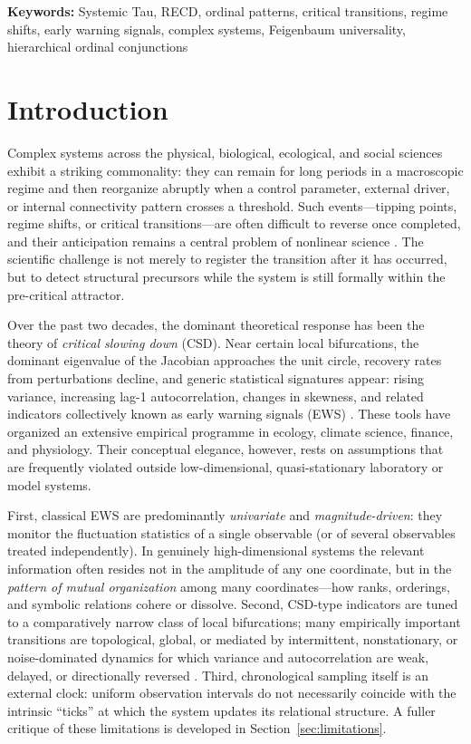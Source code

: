 \documentclass[11pt,a4paper]{article}
\begin{document}
\noindent\textbf{Keywords:}
Systemic Tau, RECD, ordinal patterns, critical transitions, regime shifts,
early warning signals, complex systems, Feigenbaum universality,
hierarchical ordinal conjunctions

\vspace{0.5cm}

\section{Introduction}
\label{sec:introduction}


Complex systems across the physical, biological, ecological, and social
sciences exhibit a striking commonality: they can remain for long periods
in a macroscopic regime and then reorganize abruptly when a control
parameter, external driver, or internal connectivity pattern crosses a
threshold. Such events---tipping points, regime shifts, or critical
transitions---are often difficult to reverse once completed, and their
anticipation remains a central problem of nonlinear science
\cite{Scheffer2009,Scheffer2012,Dakos2012}. The scientific challenge is
not merely to register the transition after it has occurred, but to detect
structural precursors while the system is still formally within the
pre-critical attractor.

Over the past two decades, the dominant theoretical response has been the
theory of \emph{critical slowing down} (CSD). Near certain local
bifurcations, the dominant eigenvalue of the Jacobian approaches the unit
circle, recovery rates from perturbations decline, and generic statistical
signatures appear: rising variance, increasing lag-1 autocorrelation,
changes in skewness, and related indicators collectively known as early
warning signals (EWS) \cite{Scheffer2009,Dakos2012,Boettiger2013}. These
tools have organized an extensive empirical programme in ecology,
climate science, finance, and physiology. Their conceptual elegance,
however, rests on assumptions that are frequently violated outside
low-dimensional, quasi-stationary laboratory or model systems.

First, classical EWS are predominantly \emph{univariate} and
\emph{magnitude-driven}: they monitor the fluctuation statistics of a
single observable (or of several observables treated independently). In
genuinely high-dimensional systems the relevant information often resides
not in the amplitude of any one coordinate, but in the
\emph{pattern of mutual organization} among many coordinates---how ranks,
orderings, and symbolic relations cohere or dissolve. Second, CSD-type
indicators are tuned to a comparatively narrow class of local
bifurcations; many empirically important transitions are topological,
global, or mediated by intermittent, nonstationary, or noise-dominated
dynamics for which variance and autocorrelation are weak, delayed, or
directionally reversed \cite{Boettiger2013,Dakos2015,Ditlevsen2010}.
Third, chronological sampling itself is an external clock: uniform
observation intervals do not necessarily coincide with the intrinsic
``ticks'' at which the system updates its relational structure. A fuller
critique of these limitations is developed in
Section~\ref{sec:limitations}.
\end{document}
